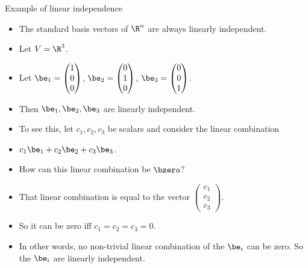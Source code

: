 \documentclass{beamer}
\begin{document}
\begin{frame}{Example of linear independence}

\begin{itemize}
\item The standard basis vectors of $\R^n$ are always linearly independent.
\item Let $V = \R^3$.
\item Let $\be_1 =
\begin{pmatrix}
1 \\ 0 \\ 0
\end{pmatrix}
$,
$\be_2 =
\begin{pmatrix}
0 \\ 1 \\ 0
\end{pmatrix}
$,
$\be_3=
\begin{pmatrix}
0 \\ 0 \\ 1
\end{pmatrix}
$.

\item Then $\be_1,\be_2,\be_3$ are linearly independent.
\item To see this, let $c_1,c_2,c_3$ be scalars and consider the linear combination
\item $c_1\be_1+c_2\be_2+c_3\be_3$.
\item How can this linear combination be $\bzero$?
\item That linear combination is equal to the vector
$
\begin{pmatrix}
c_1 \\ c_2 \\ c_3
\end{pmatrix}
$.
\item So it can be zero iff $c_1=c_2=c_3=0$.
\item In other words, no non-trivial linear combination of the $\be_i$ can be zero.
So the $\be_i$ are linearly independent.
\end{itemize}

\end{frame}

\end{document}
